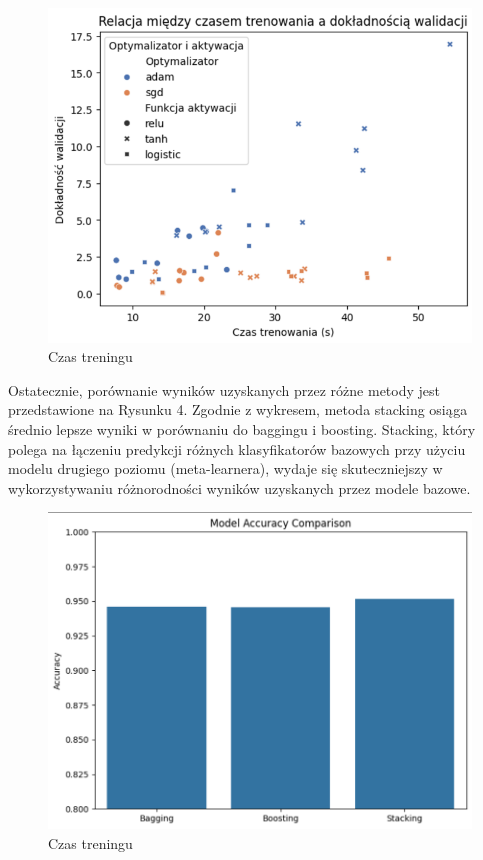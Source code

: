 \documentclass[polish,11pt,a4paper]{article}
\begin{document}
\begin{figure}[ht]
	\centering
	\includegraphics[width=0.6\linewidth]{rela}
	\caption{Czas treningu}
	\label{fig:rela}
\end{figure}

Ostatecznie, porównanie wyników uzyskanych przez różne metody jest przedstawione na Rysunku 4. Zgodnie z wykresem, metoda stacking osiąga średnio lepsze wyniki w porównaniu do baggingu i boosting. Stacking, który polega na łączeniu predykcji różnych klasyfikatorów bazowych przy użyciu modelu drugiego poziomu (meta-learnera), wydaje się skuteczniejszy w wykorzystywaniu różnorodności wyników uzyskanych przez modele bazowe.


\begin{figure}[ht]
	\centering
	\includegraphics[width=0.6\linewidth]{100accuracy}
	\caption{Czas treningu}
	\label{fig:a}
\end{figure}
\end{document}
